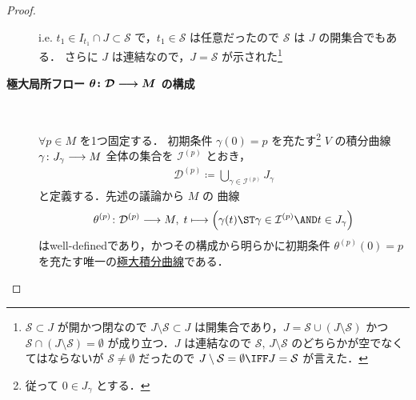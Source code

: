 \documentclass[geometry_main]{subfiles}
\begin{document}
\begin{proof}
\begin{description}
        i.e. $t_1 \in I_{t_1} \cap J \subset \mathcal{S}$ で，$t_1 \in \mathcal{S}$ は任意だったので $\mathcal{S}$ は $J$ の開集合でもある．
        さらに $J$ は連結なので，$J = \mathcal{S}$ が示された\footnote{$\mathcal{S} \subset J$ が開かつ閉なので $J \setminus \mathcal{S} \subset J$ は開集合であり，$J = \mathcal{S} \cup (J\setminus \mathcal{S})$ かつ $\mathcal{S} \cap (J \setminus \mathcal{S}) = \emptyset$ が成り立つ．$J$ は連結なので $\mathcal{S},\, J \setminus \mathcal{S}$ のどちらかが空でなくてはならないが $\mathcal{S} \neq \emptyset$ だったので $J \setminus \mathcal{S} = \emptyset \IFF J = \mathcal{S}$ が言えた．}
        \item[\textbf{極大局所フロー $\bm{\theta \colon \mathcal{D} \longrightarrow M}$ の構成}]　
        
        $\forall p \in M$ を1つ固定する．
        初期条件 $\gamma (0) = p$ を充たす\footnote{従って $0 \in J_\gamma$ とする．} $V$ の積分曲線 $\gamma \colon J_\gamma \longrightarrow M$ 全体の集合を $\mathcal{I}^{(p)}$ とおき，
        \begin{align}
            \mathcal{D}^{(p)} \coloneqq \bigcup_{\gamma \in \mathcal{I}^{(p)}} J_\gamma
        \end{align}
        と定義する．先述の議論から $M$ の \cinfty 曲線
        \begin{align}
            \theta^{(p)} \colon \mathcal{D}^{(p)} \lto M,\; t \lmto \Bigl( \gamma(t) \ST \gamma \in \mathcal{I}^{(p)} \AND t \in J_\gamma \Bigr)
        \end{align}
        はwell-definedであり，かつその構成から明らかに初期条件 $\theta^{(p)} (0) = p$ を充たす唯一の\hyperref[def:local-flow]{極大積分曲線}である．
        

\end{description}
\end{proof}
\end{document}
